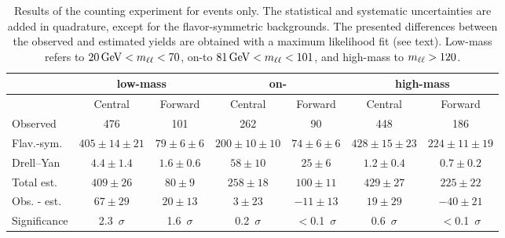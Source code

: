 
\begin{table}[btp]
 \renewcommand{\arraystretch}{1.3}
 \setlength{\belowcaptionskip}{6pt}
 \scriptsize
 \centering
 \caption{Results of the counting experiment for \MM events only.
     The statistical and systematic uncertainties are added in quadrature, except for the flavor-symmetric backgrounds. The presented differences between the observed and estimated yields are obtained with a maximum likelihood fit (see text).    Low-mass refers to $20\,\mathrm{Ge\hspace{-.08em}V} < m_{\ell\ell} < 70$\GeV, on-\Z to  $81\,\mathrm{Ge\hspace{-.08em}V} < m_{\ell\ell} < 101$\GeV, and high-mass to $m_{\ell\ell} > 120$\GeV.
     }
  \label{tab:METresults2012MM}
  \begin{tabular}{l| cc | cc | cc}

    							& \multicolumn{2}{c}{low-mass} & \multicolumn{2}{c}{on-\Z} & \multicolumn{2}{c}{high-mass} \\ 

    \hline
                                &  Central        & Forward  &  Central  & Forward   &  Central        & Forward \\ 

    \hline
        Observed       &  476                   & 101              &  262            &  90       &   448           &   186    \\

    \hline
        Flav.-sym.    & $405\pm14\pm21$        & $79\pm6\pm6$  &  $200\pm10\pm10$ & $74\pm6\pm6$ & $428\pm15\pm23$ & $224\pm11\pm19$ \\

            Drell--Yan          & $4.4\pm1.4$            & $1.6\pm0.6$      & $58\pm10$ & $25\pm6$ & $1.2\pm0.4$ & $0.7\pm0.2$ \\

    \hline
            Total est.          & $409\pm26$            & $80\pm9$      & $258\pm18$ & $100\pm11$ & $429\pm27$ & $225\pm22$ \\

    \hline
         Obs. - est.  & $67\pm29$      & $20\pm13$ & $3\pm23 $ & $-11\pm13$ & $19\pm29$ & $-40\pm21 $ \\ 

    \hline
   Significance      & 2.3~$\sigma$    &  1.6~$\sigma$  & 0.2~$\sigma$ & $<$0.1~$\sigma$ & 0.6~$\sigma$ & $<$0.1~$\sigma$ \\ 


  \end{tabular}
\end{table}


